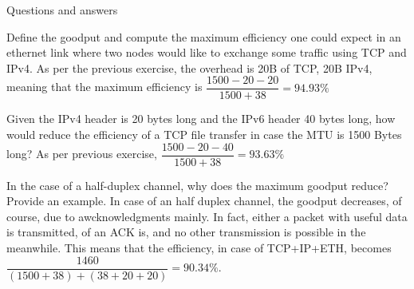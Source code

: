 \begin{section}{Questions and answers}
\begin{subsubsection}{Define the goodput and compute the maximum efficiency one could expect in an
    ethernet link where two nodes would like to exchange some traffic using TCP and IPv4.}
    As per the previous exercise, the overhead is 20B of TCP, 20B IPv4, meaning that the maximum
    efficiency is $\dfrac{1500-20-20}{1500+38}=94.93\%$
  \end{subsubsection}
  \begin{subsubsection}{Given the IPv4 header is 20 bytes long and the IPv6 header 40 bytes long,
    how would reduce the efficiency of a TCP file transfer in case the MTU is 1500 Bytes long?}
    As per previous exercise, $\dfrac{1500-20-40}{1500+38}=93.63\%$
  \end{subsubsection}
  \begin{subsubsection}{In the case of a half-duplex channel, why does the maximum goodput reduce?
    Provide an example.}
    In case of an half duplex channel, the goodput decreases, of course, due to awcknowledgments
    mainly. In fact, either a packet with useful data is transmitted, of an ACK is, and no other
    transmission is possible in the meanwhile. This means that the efficiency, in case of
    TCP+IP+ETH, becomes $\dfrac{1460}{(1500+38)+(38+20+20)}=90.34\%$.


\end{subsubsection}
\end{section}

